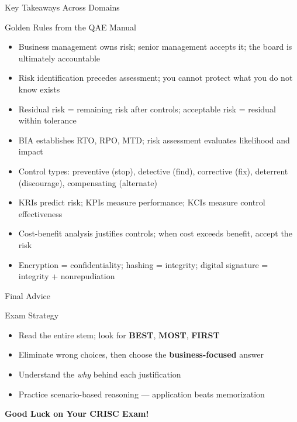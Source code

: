 \documentclass{beamer}
\begin{document}
	\begin{frame}{Key Takeaways Across Domains}
		\begin{block}{Golden Rules from the QAE Manual}
			\begin{itemize}
				\item Business management owns risk; senior management accepts it; the board is ultimately accountable
				\item Risk identification precedes assessment; you cannot protect what you do not know exists
				\item Residual risk = remaining risk after controls; acceptable risk = residual within tolerance
				\item BIA establishes RTO, RPO, MTD; risk assessment evaluates likelihood and impact
				\item Control types: preventive (stop), detective (find), corrective (fix), deterrent (discourage), compensating (alternate)
				\item KRIs predict risk; KPIs measure performance; KCIs measure control effectiveness
				\item Cost-benefit analysis justifies controls; when cost exceeds benefit, accept the risk
				\item Encryption = confidentiality; hashing = integrity; digital signature = integrity + nonrepudiation
			\end{itemize}
		\end{block}
	\end{frame}
	
	\begin{frame}{Final Advice}
		\begin{block}{Exam Strategy}
			\centering
			\vspace{0.3cm}
			\begin{itemize}
				\item Read the entire stem; look for \textbf{BEST}, \textbf{MOST}, \textbf{FIRST}
				\item Eliminate wrong choices, then choose the \textbf{business-focused} answer
				\item Understand the \textit{why} behind each justification
				\item Practice scenario-based reasoning --- application beats memorization
			\end{itemize}
			\vspace{0.5cm}
			\Large{\textbf{Good Luck on Your CRISC Exam!}}
		\end{block}
	\end{frame}
	
\end{document}

